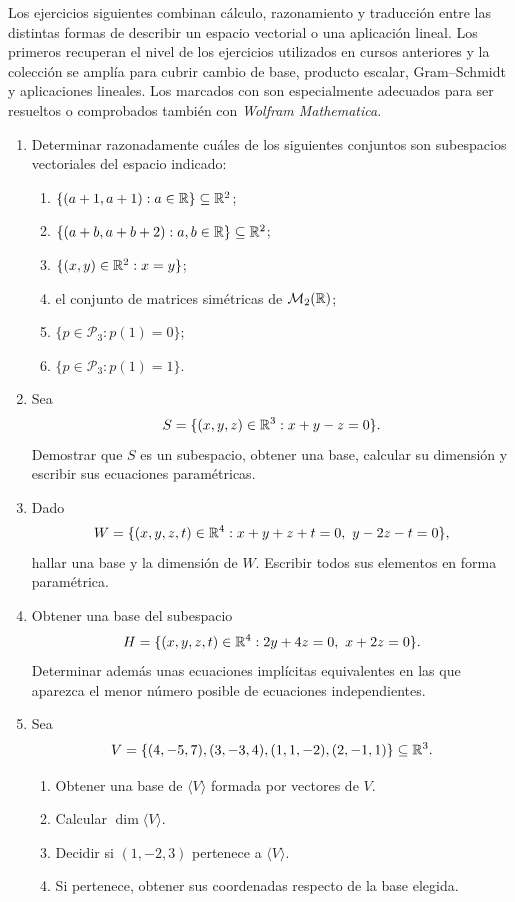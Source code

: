 Los ejercicios siguientes combinan cálculo, razonamiento y traducción entre las distintas formas de describir un espacio vectorial o una aplicación lineal. Los primeros recuperan el nivel de los ejercicios utilizados en cursos anteriores y la colección se amplía para cubrir cambio de base, producto escalar, Gram--Schmidt y aplicaciones lineales. Los marcados con \M son especialmente adecuados para ser resueltos o comprobados también con \textit{Wolfram Mathematica}.

\begin{enumerate}[label=\textbf{\arabic*.},leftmargin=*]

\item Determinar razonadamente cuáles de los siguientes conjuntos son subespacios vectoriales del espacio indicado:
\begin{enumerate}[label=\alph*)]
\item $\{(a+1,a+1):a\in\mathbb{R}\}\subseteq\mathbb{R}^2$;
\item $\{(a+b,a+b+2):a,b\in\mathbb{R}\}\subseteq\mathbb{R}^2$;
\item $\{(x,y)\in\mathbb{R}^2:x=y\}$;
\item el conjunto de matrices simétricas de $\mathcal M_2(\mathbb{R})$;
\item $\{p\in\mathcal P_3:p(1)=0\}$;
\item $\{p\in\mathcal P_3:p(1)=1\}$.
\end{enumerate}

\item Sea
\[
S=\{(x,y,z)\in\mathbb{R}^3:x+y-z=0\}.
\]
Demostrar que $S$ es un subespacio, obtener una base, calcular su dimensión y escribir sus ecuaciones paramétricas.

\item Dado
\[
W=\{(x,y,z,t)\in\R^4:x+y+z+t=0,\ y-2z-t=0\},
\]
hallar una base y la dimensión de $W$. Escribir todos sus elementos en forma paramétrica.

\item Obtener una base del subespacio
\[
H=\{(x,y,z,t)\in\mathbb{R}^4:2y+4z=0,\ x+2z=0\}.
\]
Determinar además unas ecuaciones implícitas equivalentes en las que aparezca el menor número posible de ecuaciones independientes.

\item Sea
\[
V=\{(4,-5,7),(3,-3,4),(1,1,-2),(2,-1,1)\}\subseteq\mathbb{R}^3.
\]
\begin{enumerate}[label=\alph*)]
\item Obtener una base de $\langle V\rangle$ formada por vectores de $V$.
\item Calcular $\dim\langle V\rangle$.
\item Decidir si $(1,-2,3)$ pertenece a $\langle V\rangle$.
\item Si pertenece, obtener sus coordenadas respecto de la base elegida.
\end{enumerate}


\end{enumerate}
